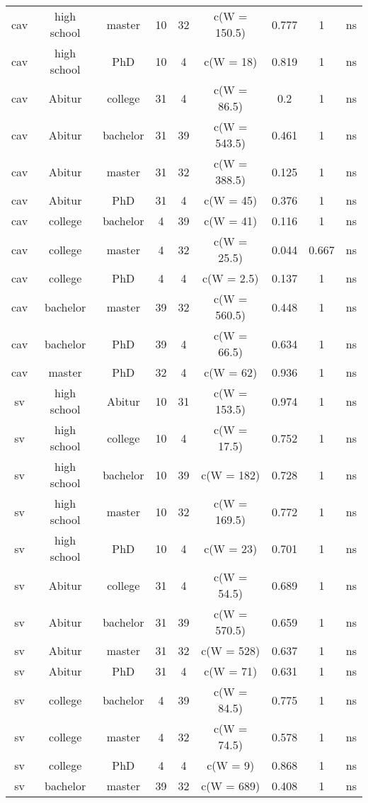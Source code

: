 \begin{table}[!htbp]
\begin{tabular}{@{\extracolsep{5pt}} ccccccccc}
cav & high school & master & 10 & 32 & c(W = 150.5) & 0.777 & 1 & ns \\ 
cav & high school & PhD & 10 & 4 & c(W = 18) & 0.819 & 1 & ns \\ 
cav & Abitur & college & 31 & 4 & c(W = 86.5) & 0.2 & 1 & ns \\ 
cav & Abitur & bachelor & 31 & 39 & c(W = 543.5) & 0.461 & 1 & ns \\ 
cav & Abitur & master & 31 & 32 & c(W = 388.5) & 0.125 & 1 & ns \\ 
cav & Abitur & PhD & 31 & 4 & c(W = 45) & 0.376 & 1 & ns \\ 
cav & college & bachelor & 4 & 39 & c(W = 41) & 0.116 & 1 & ns \\ 
cav & college & master & 4 & 32 & c(W = 25.5) & 0.044 & 0.667 & ns \\ 
cav & college & PhD & 4 & 4 & c(W = 2.5) & 0.137 & 1 & ns \\ 
cav & bachelor & master & 39 & 32 & c(W = 560.5) & 0.448 & 1 & ns \\ 
cav & bachelor & PhD & 39 & 4 & c(W = 66.5) & 0.634 & 1 & ns \\ 
cav & master & PhD & 32 & 4 & c(W = 62) & 0.936 & 1 & ns \\ 
sv & high school & Abitur & 10 & 31 & c(W = 153.5) & 0.974 & 1 & ns \\ 
sv & high school & college & 10 & 4 & c(W = 17.5) & 0.752 & 1 & ns \\ 
sv & high school & bachelor & 10 & 39 & c(W = 182) & 0.728 & 1 & ns \\ 
sv & high school & master & 10 & 32 & c(W = 169.5) & 0.772 & 1 & ns \\ 
sv & high school & PhD & 10 & 4 & c(W = 23) & 0.701 & 1 & ns \\ 
sv & Abitur & college & 31 & 4 & c(W = 54.5) & 0.689 & 1 & ns \\ 
sv & Abitur & bachelor & 31 & 39 & c(W = 570.5) & 0.659 & 1 & ns \\ 
sv & Abitur & master & 31 & 32 & c(W = 528) & 0.637 & 1 & ns \\ 
sv & Abitur & PhD & 31 & 4 & c(W = 71) & 0.631 & 1 & ns \\ 
sv & college & bachelor & 4 & 39 & c(W = 84.5) & 0.775 & 1 & ns \\ 
sv & college & master & 4 & 32 & c(W = 74.5) & 0.578 & 1 & ns \\ 
sv & college & PhD & 4 & 4 & c(W = 9) & 0.868 & 1 & ns \\ 
sv & bachelor & master & 39 & 32 & c(W = 689) & 0.408 & 1 & ns \\ 

\end{tabular}
\end{table}
